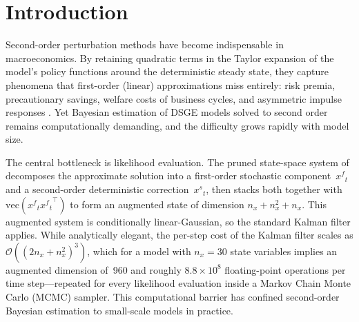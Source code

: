 \documentclass[12pt,a4paper]{article}
\newcommand{\vect}{\mathrm{vec}}
\newcommand{\xf}{{x^{f}}}
\newcommand{\xs}{{x^{s}}}
\newcommand{\cO}{\mathcal{O}}
\begin{document}
\section{Introduction}\label{sec:intro}

Second-order perturbation methods have become indispensable in
macroeconomics. By retaining quadratic terms in the Taylor expansion
of the model's policy functions around the deterministic steady state,
they capture phenomena that first-order (linear) approximations miss
entirely: risk premia, precautionary savings, welfare costs of
business cycles, and asymmetric impulse responses
\citep{schmitt2004solving, kim2008calculating}. Yet Bayesian estimation
of DSGE models solved to second order remains computationally
demanding, and the difficulty grows rapidly with model size.

The central bottleneck is likelihood evaluation. The pruned
state-space system of \citet{andreasen2018pruned} decomposes the
approximate solution into a first-order stochastic component~$\xf_t$
and a second-order deterministic correction~$\xs_t$, then stacks
both together with $\vect(\xf_t {\xf_t}^\top)$ to form an augmented
state of dimension $n_x + n_x^2 + n_x$. This augmented system is
conditionally linear-Gaussian, so the standard Kalman filter applies.
While analytically elegant, the per-step cost of the Kalman filter
scales as $\cO((2n_x + n_x^2)^3)$, which for a model with $n_x = 30$
state variables implies an augmented dimension of~960 and roughly
$8.8 \times 10^8$ floating-point operations per time step---repeated
for every likelihood evaluation inside a Markov Chain Monte Carlo
(MCMC) sampler. This computational barrier has confined second-order
Bayesian estimation to small-scale models in practice.
\end{document}
